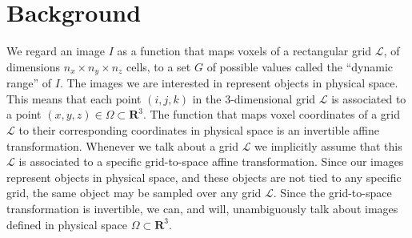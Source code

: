 \section{Background}

We regard an image $I$ as a function that maps voxels of a rectangular grid \hbox{$\mathcal{L}$}, of dimensions $n_{x} \times n_{y} \times n_{z}$ cells, to a set $G$ of
possible values called the ``dynamic range'' of $I$. The images we are interested in represent objects in physical space. This means that each point $(i,j,k)$ in the
3-dimensional grid $\mathcal{L}$ is associated to a point $(x,y,z) \in \Omega \subset \mathbf{R}^{3}$. The function that maps voxel coordinates of a grid $\mathcal{L}$ to their corresponding coordinates in physical space is an invertible affine transformation. Whenever we talk about
a grid $\mathcal{L}$ we implicitly assume that this $\mathcal{L}$ is associated to a specific grid-to-space affine transformation.
Since our images represent objects in physical space, and these objects are not tied to any specific grid, the same object may be sampled over any grid $\mathcal{L}$. Since
the grid-to-space transformation is invertible, we can, and will, unambiguously talk about images defined in physical space $\Omega \subset \mathbf{R}^{3}$.\\

